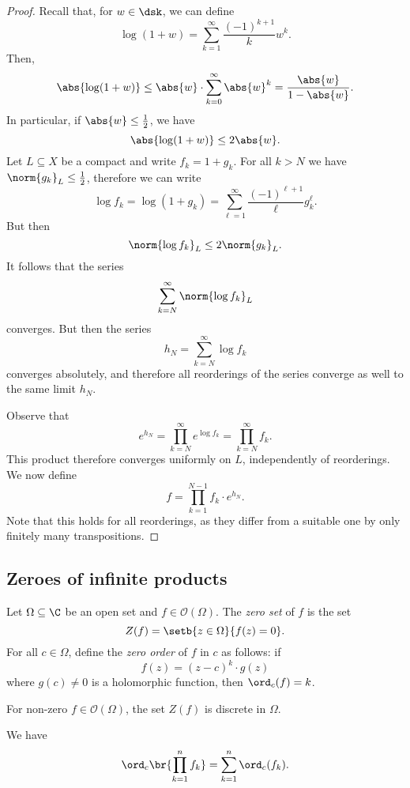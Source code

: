 \begin{proof}
Recall that, for $w \in \dsk$, we can define
\[
\log(1+w) = \sum_{k=1}^\infty \frac{(-1)^{k+1}}{k} w^k.
\]
Then,
\[
\abs{\log(1+w)} \leq
\abs{w} \cdot \sum_{k=0}^\infty \abs{w}^k =
\frac{\abs{w}}{1 - \abs{w}}.
\]
In particular, if $\abs{w} \leq \frac{1}{2}$, we have
\[
\abs{\log(1+w)} \leq 2 \abs{w}.
\]
Let $L \subseteq X$ be a compact and write $f_k = 1 + g_k$. For
all $k > N$ we have $\norm{g_k}_L \leq \frac{1}{2}$, therefore we
can write
\[
\log f_k =
\log(1 + g_k) =
\sum_{\ell=1}^\infty \frac{(-1)^{\ell+1}}{\ell} g_k^\ell.
\]
But then
\[
\norm{\log f_k}_L \leq 2 \norm{g_k}_L.
\]
It follows that the series
\[
\sum_{k=N}^\infty \norm{\log f_k}_L
\]
converges. But then the series
\[
h_N = \sum_{k=N}^\infty \log f_k
\]
converges absolutely, and therefore all reorderings of the series
converge as well to the same limit $h_N$.

Observe that
\[
e^{h_N} = \prod_{k=N}^\infty e^{\log f_k} = \prod_{k=N}^\infty f_k.
\]
This product therefore converges uniformly on $L$, independently of
reorderings. We now define
\[
f = \prod_{k=1}^{N-1} f_k \cdot e^{h_N}.
\]
Note that this holds for all reorderings, as they differ from a
suitable one by only finitely many transpositions.
\end{proof}

\newpage

\subsection{Zeroes of infinite products}


\begin{definicija}
Let $\Omega \subseteq \C$ be an open set and
$f \in \mathcal{O}(\Omega)$. The \emph{zero set} of
$f$ is the set
\[
Z(f) = \setb{z \in \Omega}{f(z) = 0}.
\]
For all $c \in \Omega$, define the
\emph{zero order} of $f$ in $c$ as follows: if
\[
f(z) = (z - c)^k \cdot g(z)
\]
where $g(c) \ne 0$ is a holomorphic function, then $\ord_c(f) = k$.
\end{definicija}

\begin{opomba}
For non-zero $f \in \mathcal{O}(\Omega)$, the set $Z(f)$ is
discrete in $\Omega$.
\end{opomba}

\begin{opomba}
We have
\[
\ord_c \br{\prod_{k=1}^n f_k} = \sum_{k=1}^n \ord_c(f_k).
\]
\end{opomba}

